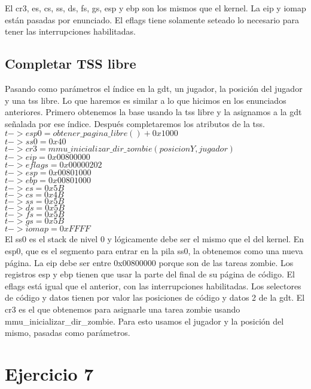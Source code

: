 \documentclass[a4paper]{article}
\begin{document}
El cr3, es, cs, ss, ds, fs, gs, esp y ebp son los mismos que el kernel. La eip y iomap están pasadas por enunciado. El eflags tiene solamente seteado lo necesario para tener las interrupciones habilitadas.    

\subsection{Completar TSS libre}

Pasando como parámetros el índice en la gdt, un jugador, la posición del jugador y una tss libre. Lo que haremos es similar a lo que hicimos en los enunciados anteriores. Primero obtenemos la base usando la tss libre y la asignamos a la gdt señalada por ese índice. Después completaremos los atributos de la tss.\\
    $t->esp0 = obtener\_pagina\_libre()+0x1000$\\
    $t->ss0 = 0x40$\\
    $t->cr3 = mmu\_inicializar\_dir\_zombie(posicionY, jugador)$\\
    $t->eip = 0x00800000$\\
    $t->eflags = 0x00000202$\\
    $t->esp = 0x00801000$\\
    $t->ebp = 0x00801000$\\
    $t->es = 0x5B$\\
    $t->cs = 0x4B$\\
    $t->ss = 0x5B$\\
    $t->ds = 0x5B$\\
    $t->fs = 0x5B$\\
    $t->gs = 0x5B$\\
    $t->iomap = 0xFFFF$\\

El ss0 es el stack de nivel 0 y lógicamente debe ser el mismo que el del kernel. En esp0, que es el segmento para entrar en la pila ss0, la obtenemos como una nueva página. La eip debe ser entre 0x00800000 porque son de las tareas zombie. Los registros esp y ebp tienen que usar la parte del final de su página de código. El eflags está igual que el anterior, con las interrupciones habilitadas. Los selectores de código y datos tienen por valor las posiciones de código y datos 2 de la gdt. El cr3 es el que obtenemos para asignarle una tarea zombie usando mmu\_inicializar\_dir\_zombie. Para esto usamos el jugador y la posición del mismo, pasadas como parámetros. 

\section{Ejercicio 7}
\end{document}
